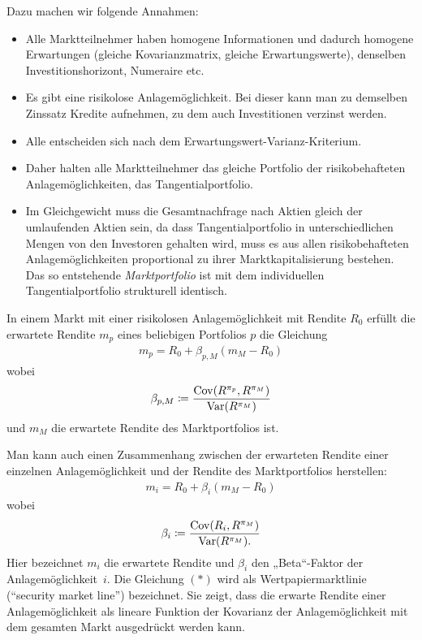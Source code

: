 \documentclass[a4paper,twoside,DIV15,BCOR12mm]{scrbook}
\DeclareMathOperator{\Var}{Var}
\DeclareMathOperator{\Cov}{Cov}
\begin{document}
Dazu machen wir folgende Annahmen:
\begin{itemize}
\item Alle Marktteilnehmer haben homogene Informationen und dadurch homogene Erwartungen (gleiche Kovarianzmatrix, gleiche Erwartungswerte), denselben Investitionshorizont, Numeraire etc.
\item Es gibt eine risikolose Anlagemöglichkeit. Bei dieser kann man zu demselben Zinssatz Kredite aufnehmen, zu dem auch Investitionen verzinst werden.
\item Alle entscheiden sich nach dem Erwartungswert-Varianz-Kriterium.
\item Daher halten alle Marktteilnehmer das gleiche Portfolio der risikobehafteten Anlagemöglichkeiten, das Tangentialportfolio.
\item Im Gleichgewicht muss die Gesamtnachfrage nach Aktien gleich der umlaufenden Aktien sein, da dass Tangentialportfolio in unterschiedlichen Mengen von den Investoren gehalten wird, muss es aus allen risikobehafteten Anlagemöglichkeiten proportional zu ihrer Marktkapitalisierung bestehen. Das so entstehende \emph{Marktportfolio} ist mit dem individuellen Tangentialportfolio strukturell identisch.
\end{itemize}

\begin{satz}
In einem Markt mit einer risikolosen Anlagemöglichkeit mit Rendite $R_0$ erfüllt die erwartete Rendite $m_p$ eines beliebigen Portfolios $p$ die Gleichung 
\begin{align*}
m_p = R_0 + \beta_{p,M}(m_M-R_0)
\end{align*}
wobei 
\begin{align*}
\beta_{p,M} \da \frac{\Cov(R^{\pi_p}, R^{\pi_M})}{\Var(R^{\pi_M})}
\end{align*}
und $m_M$ die erwartete Rendite des Marktportfolios ist.
\end{satz}

Man kann auch einen Zusammenhang zwischen der erwarteten Rendite einer einzelnen Anlagemöglichkeit und der Rendite des Marktportfolios herstellen:
\begin{align*}
m_i = R_0 + \beta_i(m_M - R_0) \tag{$*$}
\end{align*}
wobei
\[
\beta_i \da \frac{\Cov(R_i,R^{\pi_M})}{\Var(R^{\pi_M}).}
\]
Hier bezeichnet $m_i$ die erwartete Rendite und $\beta_i$ den „Beta“-Faktor der Anlagemöglichkeit~$i$.  Die Gleichung $(*)$ wird als Wertpapiermarktlinie (“security market line”) bezeichnet. Sie zeigt, dass die erwarte Rendite einer Anlagemöglichkeit als lineare Funktion der Kovarianz der Anlagemöglichkeit mit dem gesamten Markt ausgedrückt werden kann.
\end{document}
